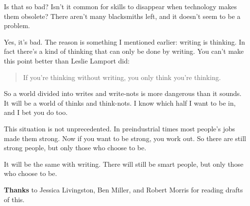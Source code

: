 Is that so bad? Isn't it common for skills to disappear when technology
makes them obsolete? There aren't many blacksmiths left, and it doesn't
seem to be a problem.

Yes, it's bad. The reason is something I mentioned earlier: writing is
thinking. In fact there's a kind of thinking that can only be done by
writing. You can't make this point better than Leslie Lamport did:

\begin{quote}
If you're thinking without writing, you only think you're thinking.
\end{quote}

So a world divided into writes and write-nots is more dangerous than it
sounds. It will be a world of thinks and think-nots. I know which half I
want to be in, and I bet you do too.

This situation is not unprecedented. In preindustrial times most
people's jobs made them strong. Now if you want to be strong, you work
out. So there are still strong people, but only those who choose to be.

It will be the same with writing. There will still be smart people, but
only those who choose to be.

\textbf{Thanks} to Jessica Livingston, Ben Miller, and Robert Morris for
reading drafts of this.